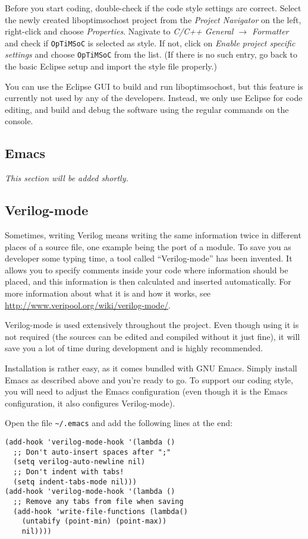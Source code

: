 Before you start coding, double-check if the code style settings are correct.
Select the newly created liboptimsochost project from the \emph{Project
Navigator} on the left, right-click and choose \emph{Properties}. Nagivate to
\emph{C/C++ General $\rightarrow$ Formatter} and check if \verb|OpTiMSoC| is
selected as style. If not, click on \emph{Enable project specific settings} and
choose \verb|OpTiMSoC| from the list. (If there is no such entry, go back to the
basic Eclipse setup and import the style file properly.)

You can use the Eclipse GUI to build and run liboptimsochost, but this feature
is currently not used by any of the developers. Instead, we only use Eclipse
for code editing, and build and debug the software using the regular commands
on the console.


\subsection{Emacs}
\emph{This section will be added shortly.}

\subsection{Verilog-mode}

Sometimes, writing Verilog means writing the same information twice in
different places of a source file, one example being the port of a module. To
save you as developer some typing time, a tool called ``Verilog-mode'' has been
invented. It allows you to specify comments inside your code where information
should be placed, and this information is then calculated and inserted
automatically. For more information about what it is and how it works, see
\url{http://www.veripool.org/wiki/verilog-mode/}.

Verilog-mode is used extensively throughout the project. Even though using it
is not required (the sources can be edited and compiled without it just fine),
it will save you a lot of time during development and is highly recommended.

Installation is rather easy, as it comes bundled with GNU Emacs. Simply install
Emacs as described above and you're ready to go. To support our coding style,
you will need to adjust the Emacs configuration (even though it is the Emacs
configuration, it also configures Verilog-mode).

Open the file \verb|~/.emacs| and add the following lines at the end:
\begin{verbatim}
(add-hook 'verilog-mode-hook '(lambda ()
  ;; Don't auto-insert spaces after ";"
  (setq verilog-auto-newline nil)
  ;; Don't indent with tabs!
  (setq indent-tabs-mode nil)))
(add-hook 'verilog-mode-hook '(lambda ()
  ;; Remove any tabs from file when saving
  (add-hook 'write-file-functions (lambda()
    (untabify (point-min) (point-max))
    nil))))
\end{verbatim}


